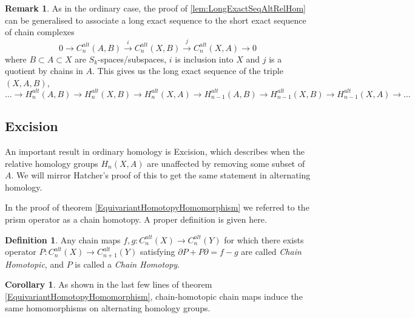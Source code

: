 \documentclass[11pt,a4paper,twoside]{article}
\theoremstyle{plain}
\theoremstyle{definition}
\newtheorem{defn}[thm]{Definition}
\theoremstyle{definition}
\theoremstyle{definition}
\newtheorem{corollary}[thm]{Corollary}
\theoremstyle{definition}
\theoremstyle{definition}
\newtheorem*{remark}{Remark}
\begin{document}
\begin{remark}
As in the ordinary case, the proof of \ref{lem:LongExactSeqAltRelHom} can be generalised to associate a long exact sequence to the short exact sequence of chain complexes 
$$0\longrightarrow C_n^{alt}(A,B)\overset{i}\longrightarrow C_n^{alt}(X,B)\overset{j}\longrightarrow C_n^{alt}(X,A)\longrightarrow 0$$
where $B\subset A\subset X$ are $S_k$-spaces/subspaces, $i$ is inclusion into $X$ and $j$ is a quotient by chains in $A$. This gives us the long exact sequence of the triple $(X,A,B)$,
$$\dots\!\rightarrow H_n^{alt}(A,B)\!\rightarrow\!H_n^{alt}(X,B)\!\rightarrow\!H_n^{alt}(X,A)\!\rightarrow\!H_{n\!-\!1}^{alt}(A,B)\!\rightarrow\!H_{n\!-\!1}^{alt}(X,B)\!\rightarrow\!H_{n\!-\!1}^{alt}(X,A)\!\rightarrow\dots$$
\end{remark}



\subsection{Excision}
\label{Sec:Excision}
An important result in ordinary homology is Excision, which describes when the relative homology groups $H_n(X,A)$ are unaffected by removing some subset of $A$. We will mirror Hatcher's proof of this to get the same statement in alternating homology.

In the proof of theorem \ref{EquivariantHomotopyHomomorphism} we referred to the prism operator as a chain homotopy. A proper definition is given here.

\begin{defn}
Any chain maps $f,g\!:\!C_n^{alt}(X)\!\longrightarrow\!C_n^{alt}(Y)$ for which there exists operator $P\!:\!C_n^{alt}(X)\!\longrightarrow\!C_{n\!+\!1}^{alt}(Y)$ satisfying $\partial P + P\partial = f-g$ are called \emph{Chain Homotopic}, and $P$ is called a \emph{Chain Homotopy}.
\end{defn}

\begin{corollary}\label{Cor:ChnHmtpcChnMps_SmHmmrphsms}
As shown in the last few lines of theorem \ref{EquivariantHomotopyHomomorphism}, chain-homotopic chain maps induce the same homomorphisms on alternating homology groups.
\end{corollary}
\end{document}
